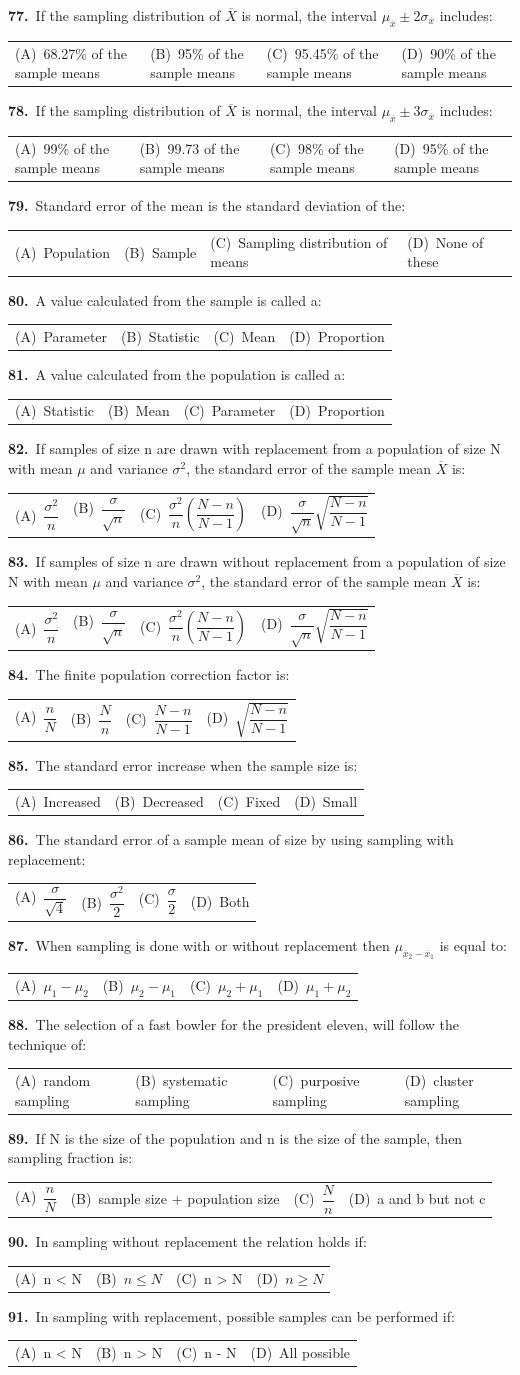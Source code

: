 \documentclass[11pt,a4paper]{article}
\makeatletter
\newcommand{\mcq}[6]{%
  \Needspace{4\baselineskip}%
  \par\medskip\noindent\textbf{#1.}\ #2\par\nopagebreak
  \noindent\begin{tabularx}{\linewidth}{@{\hspace{1.5em}}*{4}{>{\raggedright\arraybackslash}X}@{}}
    (A)~#3 & (B)~#4 & (C)~#5 & (D)~#6
  \end{tabularx}\par}
\makeatother
\begin{document}
\mcq{77}{If the sampling distribution of $\overline{X}$ is normal, the interval $\mu_{\overline{x}}\pm2\sigma_{\overline{x}}$ includes:}{68.27\% of the sample means}{95\% of the sample means}{95.45\% of the sample means}{90\% of the sample means}
\mcq{78}{If the sampling distribution of $\overline{X}$ is normal, the interval $\mu_{\overline{x}}\pm3\sigma_{\overline{x}}$ includes:}{99\% of the sample means}{99.73 of the sample means}{98\% of the sample means}{95\% of the sample means}
\mcq{79}{Standard error of the mean is the standard deviation of the:}{Population}{Sample}{Sampling distribution of means}{None of these}
\mcq{80}{A value calculated from the sample is called a:}{Parameter}{Statistic}{Mean}{Proportion}
\mcq{81}{A value calculated from the population is called a:}{Statistic}{Mean}{Parameter}{Proportion}
\mcq{82}{If samples of size n are drawn with replacement from a population of size N with mean $\mu$ and variance $\sigma^{2}$, the standard error of the sample mean $\overline{X}$ is:}{$\dfrac{\sigma^{2}}{n}$}{$\dfrac{\sigma}{\sqrt{n}}$}{$\dfrac{\sigma^{2}}{n}\left(\dfrac{N-n}{N-1}\right)$}{$\dfrac{\sigma}{\sqrt{n}}\sqrt{\dfrac{N-n}{N-1}}$}
\mcq{83}{If samples of size n are drawn without replacement from a population of size N with mean $\mu$ and variance $\sigma^{2}$, the standard error of the sample mean $\overline{X}$ is:}{$\dfrac{\sigma^{2}}{n}$}{$\dfrac{\sigma}{\sqrt{n}}$}{$\dfrac{\sigma^{2}}{n}\left(\dfrac{N-n}{N-1}\right)$}{$\dfrac{\sigma}{\sqrt{n}}\sqrt{\dfrac{N-n}{N-1}}$}
\mcq{84}{The finite population correction factor is:}{$\dfrac{n}{N}$}{$\dfrac{N}{n}$}{$\dfrac{N-n}{N-1}$}{$\sqrt{\dfrac{N-n}{N-1}}$}
\mcq{85}{The standard error increase when the sample size is:}{Increased}{Decreased}{Fixed}{Small}
\mcq{86}{The standard error of a sample mean of size by using sampling with replacement:}{$\dfrac{\sigma}{\sqrt{4}}$}{$\dfrac{\sigma^{2}}{2}$}{$\dfrac{\sigma}{2}$}{Both}
\mcq{87}{When sampling is done with or without replacement then $\mu_{\overline{x}_{2}-\overline{x}_{1}}$ is equal to:}{$\mu_{1}-\mu_{2}$}{$\mu_{2}-\mu_{1}$}{$\mu_{2}+\mu_{1}$}{$\mu_{1}+\mu_{2}$}
\mcq{88}{The selection of a fast bowler for the president eleven, will follow the technique of:}{random sampling}{systematic sampling}{purposive sampling}{cluster sampling}
\mcq{89}{If N is the size of the population and n is the size of the sample, then sampling fraction is:}{$\dfrac{n}{N}$}{sample size + population size}{$\dfrac{N}{n}$}{a and b but not c}
\mcq{90}{In sampling without replacement the relation holds if:}{n < N}{$n\leq N$}{n > N}{$n\geq N$}
\mcq{91}{In sampling with replacement, possible samples can be performed if:}{n < N}{n > N}{n - N}{All possible}
\end{document}
